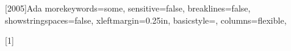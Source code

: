 
\newcommand{\newterm}[1]{\emph{#1}}    %
\newcommand{\code}[1]{\texttt{#1}}     %
\newcommand{\filename}[1]{\texttt{#1}} %
\newcommand{\SPARK}{\textsc{Spark}}    %


%
\let\underscore\_
\newcommand{\breakingunderscore}{\renewcommand{\_}{\underscore\hspace{0pt}}}

\breakingunderscore



\long{} 


[2005]{Ada}
{
  morekeywords={some},
  sensitive=false,
  breaklines=false,
  showstringspaces=false,
  xleftmargin=0.25in,
  basicstyle=\small\sffamily,
  columns=flexible,
}
\lstset{language=Ada2012, showlines=true}

%
[1]
   {\lstset{language=Ada2012,xleftmargin=#1}}
   {}
   
%
\newcommand{\wideinputlisting}[2]{%
   }


